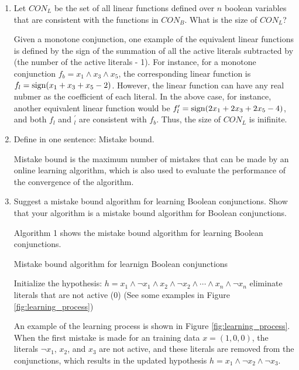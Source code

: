\begin{enumerate}
\item Let $CON_L$ be the set of all linear functions defined over $n$ boolean variables that are consistent with the functions in $CON_B$. What is the size of $CON_L$?

Given a monotone conjunction, one example of the equivalent linear functions is defined by the sign of the summation of all the active literals subtracted by (the number of the active literals - 1). For instance, for a monotone conjunction $f_b = x_1 \wedge x_3 \wedge x_5$, the corresponding linear function is $f_l = {\rm sign}(x_1 + x_3 + x_5 - 2)$. However, the linear function can have any real nubmer as the coefficient of each literal. In the above case, for instance, another equivalent linear function would be $f_l^\prime = {\rm sign}(2 x_1 + 2 x_3 + 2 x_5 - 4)$, and both $f_l$ and $_l^\prime$ are consistent with $f_b$. Thus, the size of $CON_L$ is inifinite.

\item Define in one sentence: Mistake bound.

Mistake bound is the maximum number of mistakes that can be made by an online learning algorithm, which is also used to evaluate the performance of the convergence of the algorithm. 

\item Suggest a mistake bound algorithm for learning Boolean conjunctions. Show that your algorithm is a mistake bound algorithm for Boolean conjunctions.

Algorithm 1 shows the mistake bound algorithm for learning Boolean conjunctions.

\begin{algorithm}
\caption{Mistake bound algorithm for learnign Boolean conjunctions}\label{euclid}
\begin{algorithmic}[1]
\State Initialize the hypothesis: $h =  x_1 \wedge \neg x_1 \wedge x_2 \wedge \neg x_2 \wedge \cdots \wedge x_n \wedge \neg x_n$
\State eliminate literals that are not active (0) \hspace*{\fill} (See some examples in Figure \ref{fig:learning_process})
\EndIf
\EndFor
\EndProcedure
\end{algorithmic}
\end{algorithm}



An example of the learning process is shown in Figure \ref{fig:learning_process}. When the first mistake is made for an training data $x=(1, 0, 0)$, the literals $\neg x_1$, $ x_2$, and $x_3$ are not active, and these literals are removed from the conjunctions, which results in the updated hypothesis $h = x_1 \wedge \neg x_2 \wedge \neg x_3$. 


\end{enumerate}
